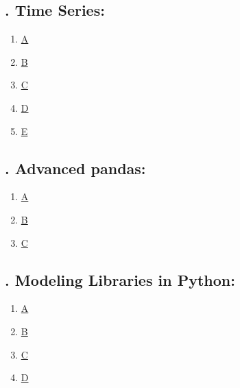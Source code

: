 \documentclass[11pt]{article}
\begin{document}
\subsection*{\small {}. Time Series:}

\vspace{-0.5cm}

\begin{multicols}{6}
	\begin{enumerate}
		\item \href{https://mp.weixin.qq.com/s/ZjWwoeHNn2ZE9T6ueI4AXA}{A}	%
		\item \href{https://mp.weixin.qq.com/s/XLb4IcLrcMfCNRpZxc-Aww}{B}	%
		\item \href{https://mp.weixin.qq.com/s/-nMZzKSat6k4udAxjH608Q}{C}	%
		\item \href{https://mp.weixin.qq.com/s/VHVogwo3jtWQmedxGt78Mw}{D}	%
		\item \href{https://mp.weixin.qq.com/s/5YjhMQYBbnopVExmqexyrA}{E}	%
	\end{enumerate}
\end{multicols}

\subsection*{\small {}. Advanced pandas:}

\vspace{-0.5cm}

\begin{multicols}{6}
	\begin{enumerate}
		\item \href{https://mp.weixin.qq.com/s/A82e5rhhC4FldJo0B0qp6Q}{A}	%
		\item \href{https://mp.weixin.qq.com/s/3mSukVHVIXlRMoeuY7YF5w}{B}	%
		\item \href{https://mp.weixin.qq.com/s/YzLXCchjXrv207qyIcpUmw}{C}	%
	\end{enumerate}
\end{multicols}

\subsection*{\small {}. Modeling Libraries in Python:}

\vspace{-0.5cm}

\begin{multicols}{6}
	\begin{enumerate}
		\item \href{https://mp.weixin.qq.com/s/Ecd4FJD4N3S6rstPv3sN_g}{A}	%
		\item \href{https://mp.weixin.qq.com/s/x22mx35bgrZ3m2cJt5Bblg}{B}	%
		\item \href{https://mp.weixin.qq.com/s/YA7V5-Ee6tIG9rK8t1gOtw}{C}	%
		\item \href{https://mp.weixin.qq.com/s/RNM4q8jWqNdMuJ5Xr2Fevw}{D}	%
	\end{enumerate}
\end{multicols}
\end{document}
